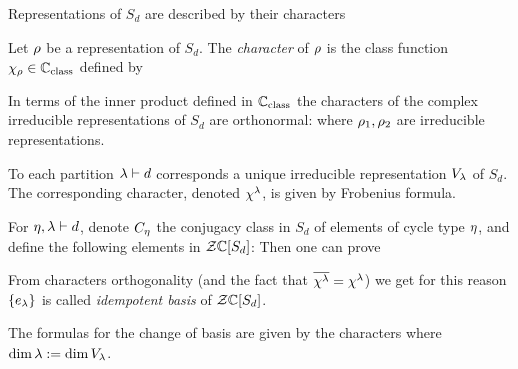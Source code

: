\documentclass[10pt,handout]{beamer} %
\begin{document}
\begin{frame}

Representations of $S_d$ are described by their characters

\begin{definition}
	Let $\rho$ be a representation of $S_d$. The \emph{character} of $\rho$ is the class function $\chi_\rho\in\mathbb C_{\text{class}}$ defined by
	\deq{\c_\r(\s):=\tr(\r(\s))}
\end{definition}

\pause

\begin{theorem}
	In terms of the inner product defined in $\mathbb C_{\text{class}}$ the characters of the complex irreducible representations of $S_d$ are orthonormal:
	where $\rho_1,\rho_2$ are irreducible representations.  
\end{theorem}

\pause

\begin{theorem}
	To each partition $\lambda\vdash d$ corresponds a unique irreducible representation $V_\lambda$ of $S_d$. The corresponding character, denoted $\chi^\lambda$, is given by Frobenius formula.
\end{theorem}

\end{frame}

\begin{frame}

For $\eta,\lambda\vdash d$, denote $C_\eta$ the conjugacy class in $S_d$ of elements of cycle type $\eta$, and define the following elements in $\mathcal Z\mathbb C[S_d]$:
Then one can prove

\pause

From characters orthogonality (and the fact that $\overline{\chi^\lambda}=\chi^\lambda$) we get
for this reason $\{e_\lambda\}$ is called \emph{idempotent basis} of $\mathcal Z\mathbb C[S_d]$.

\pause

The formulas for the change of basis are given by the characters
where $\dim \lambda:=\dim V_\lambda$. 

\end{frame}
\end{document}
